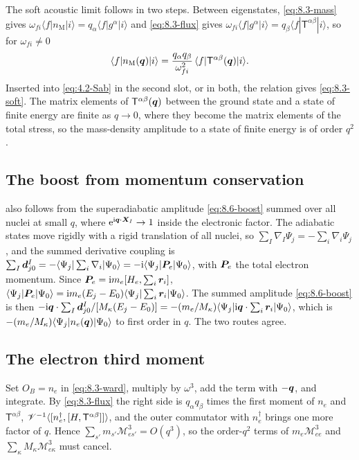 The soft acoustic limit follows in two steps. Between eigenstates, \cref{eq:8.3-mass} gives $\omega_{fi}\langle f|n_{\mathrm{M}}|i\rangle = q_\alpha\langle f|g^\alpha|i\rangle$ and \cref{eq:8.3-flux} gives $\omega_{fi}\langle f|g^\alpha|i\rangle = q_\beta\langle f|\mathsf{T}^{\alpha\beta}|i\rangle$, so for $\omega_{fi} \neq 0$
\begin{equation*}
  \langle f|n_{\mathrm{M}}(\bm{q})|i\rangle = \frac{q_\alpha q_\beta}{\omega_{fi}^2}\,\langle f|\mathsf{T}^{\alpha\beta}(\bm{q})|i\rangle .
\end{equation*}
Inserted into \cref{eq:4.2-Sab} in the second slot, or in both, the relation gives \cref{eq:8.3-soft}. The matrix elements of $\mathsf{T}^{\alpha\beta}(\bm{q})$ between the ground state and a state of finite energy are finite as $q \to 0$, where they become the matrix elements of the total stress, so the mass-density amplitude to a state of finite energy is of order $q^2$.

\subsection{The boost from momentum conservation}

 also follows from the superadiabatic amplitude \cref{eq:8.6-boost} summed over all nuclei at small $q$, where $\mathrm{e}^{\mathrm{i}\bm{q}\cdot\bm{X}_I} \to 1$ inside the electronic factor. The adiabatic states move rigidly with a rigid translation of all nuclei, so $\sum_I\nabla_I\Psi_j = -\sum_i\nabla_i\Psi_j$, and the summed derivative coupling is $\sum_I\bm{d}^I_{j0} = -\langle\Psi_j|\sum_i\nabla_i|\Psi_0\rangle = -\mathrm{i}\langle\Psi_j|\bm{P}_e|\Psi_0\rangle$, with $\bm{P}_e$ the total electron momentum. Since $\bm{P}_e = \mathrm{i} m_e[H_e, \sum_i\bm{r}_i]$, $\langle\Psi_j|\bm{P}_e|\Psi_0\rangle = \mathrm{i} m_e(E_j - E_0)\langle\Psi_j|\sum_i\bm{r}_i|\Psi_0\rangle$. The summed amplitude \cref{eq:8.6-boost} is then $-\mathrm{i}\bm{q}\cdot\sum_I\bm{d}^I_{j0}/[M_\kappa(E_j - E_0)] = -(m_e/M_\kappa)\langle\Psi_j|\mathrm{i}\bm{q}\cdot\sum_i\bm{r}_i|\Psi_0\rangle$, which is $-(m_e/M_\kappa)\langle\Psi_j|n_e(\bm{q})|\Psi_0\rangle$ to first order in $q$. The two routes agree.

\subsection{The electron third moment}

Set $O_B = n_e$ in \cref{eq:8.3-ward}, multiply by $\omega^3$, add the term with $-\bm{q}$, and integrate. By \cref{eq:8.3-flux} the right side is $q_\alpha q_\beta$ times the first moment of $n_e$ and $\mathsf{T}^{\alpha\beta}$, $\mathscr{V}^{-1}\langle[n_e^\dagger, [H, \mathsf{T}^{\alpha\beta}]]\rangle$, and the outer commutator with $n_e^\dagger$ brings one more factor of $q$. Hence $\sum_{s'}m_{s'}\mathscr{M}^3_{es'} = O(q^3)$, so the order-$q^2$ terms of $m_e\mathscr{M}^3_{ee}$ and $\sum_\kappa M_\kappa\mathscr{M}^3_{e\kappa}$ must cancel.

